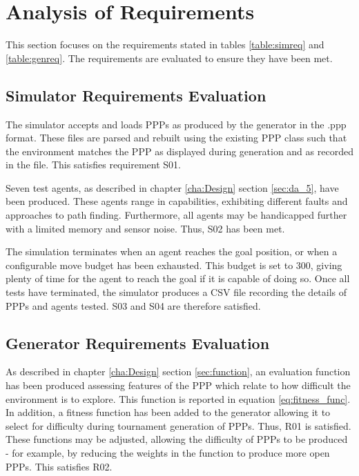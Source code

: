 \documentclass[authoryearcitations]{UoYCSproject}
\begin{document}
\section{Analysis of Requirements}
\label{sec:req_eval}
This section focuses on the requirements stated in tables \ref{table:simreq} and \ref{table:genreq}. The requirements are evaluated to ensure they have been met.

\subsection{Simulator Requirements Evaluation}
\label{sec:sim_req_eval}
The simulator accepts and loads PPPs as produced by the generator in the .ppp format. These files are parsed and rebuilt using the existing PPP class such that the environment matches the PPP as displayed during generation and as recorded in the file. This satisfies requirement S01. 

Seven test agents, as described in chapter \ref{cha:Design} section \ref{sec:da_5}, have been produced. These agents range in capabilities, exhibiting different faults and approaches to path finding. Furthermore, all agents may be handicapped further with a limited memory and sensor noise. Thus, S02 has been met.

The simulation terminates when an agent reaches the goal position, or when a configurable move budget has been exhausted. This budget is set to 300, giving plenty of time for the agent to reach the goal if it is capable of doing so. Once all tests have terminated, the simulator produces a CSV file recording the details of PPPs and agents tested. S03 and S04 are therefore satisfied.

\subsection{Generator Requirements Evaluation}
\label{sec:gen_req_eval}
As described in chapter \ref{cha:Design} section \ref{sec:function}, an evaluation function has been produced assessing features of the PPP which relate to how difficult the environment is to explore. This function is reported in equation \ref{eq:fitness_func}. In addition, a fitness function has been added to the generator allowing it to select for difficulty during tournament generation of PPPs. Thus, R01 is satisfied. These functions may be adjusted, allowing the difficulty of PPPs to be produced - for example, by reducing the weights in the function to produce more open PPPs. This satisfies R02.
\end{document}
